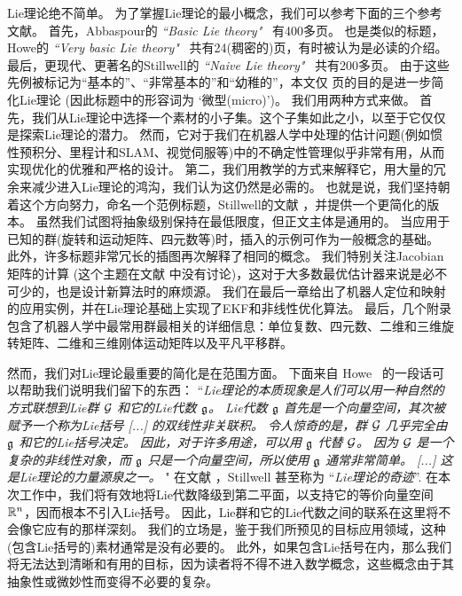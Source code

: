 Lie理论绝不简单。 
为了掌握Lie理论的最小概念，我们可以参考下面的三个参考文献。 
首先，Abbaspour的 \emph{``Basic Lie theory"}~\cite{ABBASPOUR-2007-Basic_Lie_theory} 有400多页。
也是类似的标题，Howe的 \emph{``Very basic Lie theory"}~\cite{Howe-Basic_Lie} 共有24(稠密的)页，有时被认为是必读的介绍。
最后，更现代、更著名的Stillwell的 \emph{``Naive Lie theory"}~\cite{STILLWELL-08} 共有200多页。
%
由于这些先例被标记为“基本的”、“非常基本的”和“幼稚的”，本文仅 \pageref{LastPage} 页的目的是进一步简化Lie理论 (因此标题中的形容词为 `微型(micro)')。
我们用两种方式来做。
首先，我们从Lie理论中选择一个素材的小子集。这个子集如此之小，以至于它仅仅是探索Lie理论的潜力。 
然而，它对于我们在机器人学中处理的估计问题(例如惯性预积分、里程计和SLAM、视觉伺服等)中的不确定性管理似乎非常有用，从而实现优化的优雅和严格的设计。
第二，我们用教学的方式来解释它，用大量的冗余来减少进入Lie理论的鸿沟，我们认为这仍然是必需的。
也就是说，我们坚持朝着这个方向努力，命名一个范例标题，Stillwell的文献 \cite{STILLWELL-08}，并提供一个更简化的版本。
虽然我们试图将抽象级别保持在最低限度，但正文主体是通用的。
当应用于已知的群(旋转和运动矩阵、四元数等)时，插入的示例可作为一般概念的基础。 
此外，许多标题非常冗长的插图再次解释了相同的概念。
我们特别关注Jacobian矩阵的计算 (这个主题在文献 \cite{STILLWELL-08} 中没有讨论)，这对于大多数最优估计器来说是必不可少的，也是设计新算法时的麻烦源。
我们在最后一章给出了机器人定位和映射的应用实例，并在Lie理论基础上实现了EKF和非线性优化算法。
最后，几个附录包含了机器人学中最常用群最相关的详细信息：单位复数、四元数、二维和三维旋转矩阵、二维和三维刚体运动矩阵以及平凡平移群。

然而，我们对Lie理论最重要的简化是在范围方面。 
下面来自 
Howe~\cite{Howe-Basic_Lie} 的一段话可以帮助我们说明我们留下的东西：
%
``\emph{Lie理论的本质现象是人们可以用一种自然的方式联想到Lie群 $\mathcal{G}$ 和它的Lie代数 $\frak{g}$。
Lie代数 $\frak{g}$ 首先是一个向量空间，其次被赋予一个称为Lie括号 [...] 的双线性非关联积。 
令人惊奇的是，群 $\mathcal{G}$ 几乎完全由 $\frak{g}$ 和它的Lie括号决定。
因此，对于许多用途，可以用 $\frak{g}$ 代替 $\mathcal{G}$。
因为 $\mathcal{G}$ 是一个复杂的非线性对象，而 $\frak{g}$ 只是一个向量空间，所以使用 $\frak{g}$ 通常非常简单。
[...] 
这是Lie理论的力量源泉之一。%
}"
%
在文献 \cite{STILLWELL-08}，Stillwell 甚至称为 ``\emph{Lie理论的奇迹}''.
在本次工作中，我们将有效地将Lie代数降级到第二平面，以支持它的等价向量空间 ${\mathbb R}^n$，因而根本不引入Lie括号。
因此，Lie群和它的Lie代数之间的联系在这里将不会像它应有的那样深刻。
我们的立场是，鉴于我们所预见的目标应用领域，这种(包含Lie括号的)素材通常是没有必要的。
此外，如果包含Lie括号在内，那么我们将无法达到清晰和有用的目标，因为读者将不得不进入数学概念，这些概念由于其抽象性或微妙性而变得不必要的复杂。



